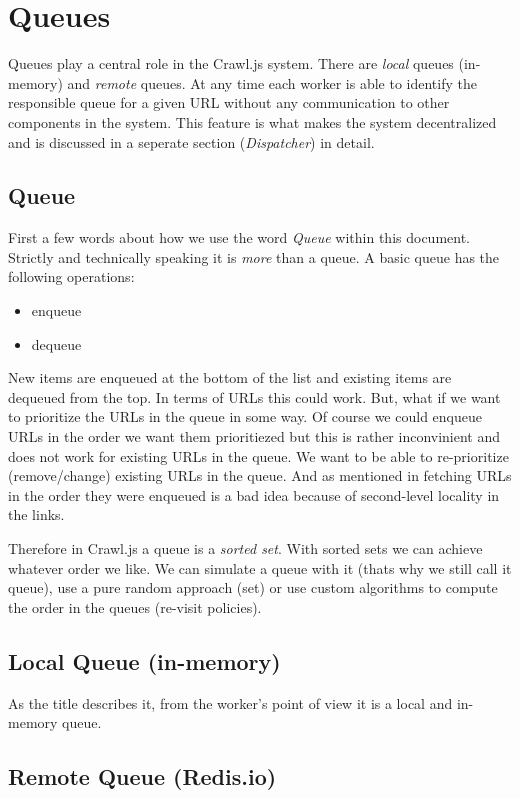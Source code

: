 \section{Queues}
Queues play a central role in the Crawl.js system. There are \emph{local} queues (in-memory) and \emph{remote} queues. At any time each worker is able to identify the responsible queue for a given URL without any communication to other components in the system. This feature is what makes the system decentralized and is discussed in a seperate section (\emph{Dispatcher}) in detail.

\subsection{Queue}
First a few words about how we use the word \emph{Queue} within this document. Strictly and technically speaking it is \emph{more} than a queue. A basic queue has the following operations:
\begin{itemize}
  \item enqueue
  \item dequeue
\end{itemize}

New items are enqueued at the bottom of the list and existing items are dequeued from the top. In terms of URLs this could work. But, what if we want to prioritize the URLs in the queue in some way. Of course we could enqueue URLs in the order we want them prioritiezed but this is rather inconvinient and does not work for existing URLs in the queue. We want to be able to re-prioritize (remove/change) existing URLs in the queue. And as mentioned in \cite{hp_crawler} fetching URLs in the order they were enqueued is a bad idea because of second-level locality in the links.

Therefore in Crawl.js a queue is a \emph{sorted set}. With sorted sets we can achieve whatever order we like. We can simulate a queue with it (thats why we still call it queue), use a pure random approach (set) or use custom algorithms to compute the order in the queues (re-visit policies).

\subsection{Local Queue (in-memory)}
As the title describes it, from the worker's point of view it is a local and in-memory queue.

\subsection{Remote Queue (Redis.io)}

